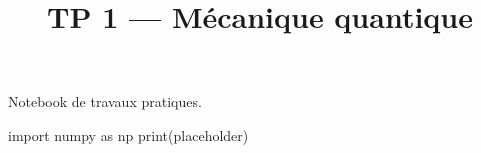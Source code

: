 \documentclass[
  french,
  12pt,
]{article}
\title{TP 1 --- Mécanique quantique}
\author{}
\date{}
\newenvironment{Shaded}{\begin{snugshade}}{\end{snugshade}}
\newcommand{\BuiltInTok}[1]{\textcolor[rgb]{0.00,0.23,0.31}{#1}}
\newcommand{\ImportTok}[1]{\textcolor[rgb]{0.00,0.46,0.62}{#1}}
\newcommand{\NormalTok}[1]{\textcolor[rgb]{0.00,0.23,0.31}{#1}}
\newcommand{\StringTok}[1]{\textcolor[rgb]{0.13,0.47,0.30}{#1}}
\begin{document}
\maketitle


Notebook de travaux pratiques.

\begin{Shaded}
\begin{Highlighting}[]
\ImportTok{import}\NormalTok{ numpy }\ImportTok{as}\NormalTok{ np}
\BuiltInTok{print}\NormalTok{(}\StringTok{\textquotesingle{}placeholder\textquotesingle{}}\NormalTok{)}
\end{Highlighting}
\end{Shaded}
\end{document}
